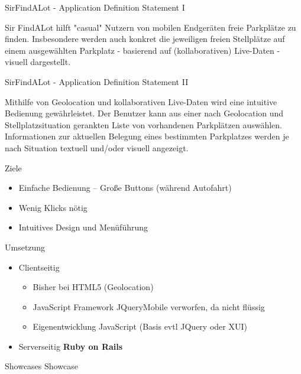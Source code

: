 
\begin{frame}[t,plain]
\titlepage
\end{frame}

\begin{frame}[t]{SirFindALot - Application Definition Statement I}

Sir FindALot hilft "casual" Nutzern von mobilen Endgeräten freie Parkplätze zu finden. 
Insbesondere werden auch konkret die jeweiligen freien Stellplätze auf einem ausgewählten 
Parkplatz - basierend auf (kollaborativen) Live-Daten - visuell dargestellt.

\end{frame}

\begin{frame}[t]{SirFindALot - Application Definition Statement II}

Mithilfe von Geolocation und kollaborativen Live-Daten wird eine intuitive Bedienung 
gewährleistet. Der Benutzer kann aus einer nach Geolocation und Stellplatzsituation gerankten 
Liste von vorhandenen Parkplätzen auswählen. Informationen zur aktuellen Belegung eines 
bestimmten Parkplatzes werden je nach Situation textuell und/oder visuell angezeigt. 

\end{frame}


\begin{frame}[t,fragile]{Ziele}
\begin{itemize}
\item Einfache Bedienung -- Große Buttons (während Autofahrt)
\item Wenig Klicks nötig
\item Intuitives Design und Menüführung
\end{itemize}
\end{frame}

\begin{frame}[t,fragile]{Umsetzung}
\begin{itemize}
	\item Clientseitig
		\begin{itemize}
			\item Bisher bei HTML5 (Geolocation)
			\item JavaScript Framework JQueryMobile verworfen, da nicht flüssig
			\item Eigenentwicklung JavaScript (Basis evtl JQuery oder XUI)
		\end{itemize}
	\item Serverseitig
		\textbf{Ruby on Rails} 
\end{itemize}
\end{frame}

\begin{frame}[t,fragile]{Showcases}
	Showcase
\end{frame}
